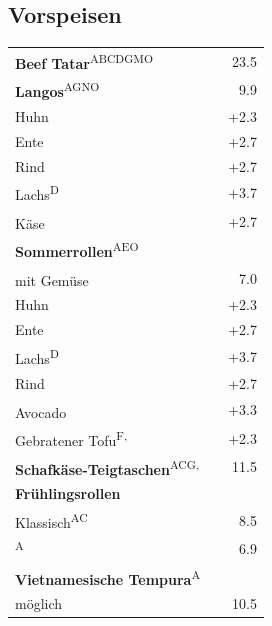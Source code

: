 \documentclass[a4paper,12pt]{article}
\newcommand{\vegan}{\textbf{\scriptsize \color{vegan}{Vegan}}}
\newcommand{\vegetarisch}{\textbf{\scriptsize \color{vegan}{Veg}}}
\begin{document}
\begin{multicols}{2}
\section*{Vorspeisen}
\begin{tabular}{Lrr}
\textbf{Beef Tatar}\textsuperscript{{\scriptsize ABCDGMO}} & & 23.5\vspace{0.1cm}\\
\textbf{Langos}\textsuperscript{{\scriptsize AGNO}} & & 9.9\\
\hspace{0.4cm}Huhn & & +2.3\\
\hspace{0.4cm}Ente & & +2.7\\
\hspace{0.4cm}Rind & & +2.7\\
\hspace{0.4cm}Lachs\textsuperscript{{\scriptsize D}} & & +3.7\\
\hspace{0.4cm}Käse\textsuperscript{\vegetarisch} & & +2.7\vspace{0.1cm}\\
\textbf{Sommerrollen}\textsuperscript{{\scriptsize AEO}}\\
\hspace{0.4cm}mit Gemüse\textsuperscript{{\scriptsize \vegan}} & & 7.0\\
\hspace{0.4cm}Huhn & & +2.3\\
\hspace{0.4cm}Ente & & +2.7\\
\hspace{0.4cm}Lachs\textsuperscript{{\scriptsize D}} & & +3.7\\
\hspace{0.4cm}Rind & & +2.7\\
\hspace{0.4cm}Avocado\textsuperscript{{\scriptsize \vegan}} & & +3.3\\
\hspace{0.4cm}Gebratener Tofu\textsuperscript{{\scriptsize F, \vegan}} & & +2.3\vspace{0.1cm}\\
\textbf{Schafkäse-Teigtaschen}\textsuperscript{{\scriptsize ACG, \vegetarisch}} & & 11.5\vspace{0.1cm}\\
\textbf{Frühlingsrollen}\\
\hspace{0.4cm}Klassisch\textsuperscript{{\scriptsize AC}} & & 8.5\\
\textsuperscript{{\scriptsize A}} & & 6.9\vspace{0.1cm}\\
\textbf{Vietnamesische Tempura}\textsuperscript{{\scriptsize A}}\\
\hspace{0.4cm}\scriptsize {} möglich & & 10.5
\end{tabular}



\end{multicols}
\end{document}
